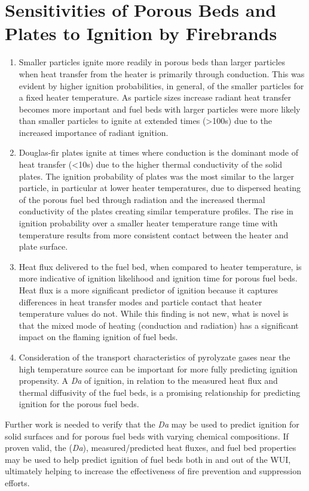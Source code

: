 \section{Sensitivities of Porous Beds and Plates to Ignition by Firebrands}
        \begin{enumerate}
            \item 
                Smaller particles ignite more readily in porous beds than larger particles when heat transfer from the heater is primarily through conduction. This was evident by higher ignition probabilities, in general, of the smaller particles for a fixed heater temperature. As particle sizes increase radiant heat transfer becomes more important and fuel beds with larger particles were more likely than smaller particles to ignite at extended times (\textgreater 100\si{\second}) due to the increased importance of radiant ignition. 
            \item
                Douglas-fir plates ignite at times where conduction is the dominant mode of heat transfer (\textless 10\si{\second}) due to the higher thermal conductivity of the solid plates. The ignition probability of plates was the most similar to the larger particle, in particular at lower heater temperatures, due to dispersed heating of the porous fuel bed through radiation and the increased thermal conductivity of the plates creating similar temperature profiles. The rise in ignition probability  over a smaller heater temperature range time with temperature results from more consistent contact between the heater and plate surface.
            \item 
                Heat flux delivered to the fuel bed, when compared to heater temperature, is more indicative of ignition likelihood and ignition time for porous fuel beds. Heat flux is a more significant predictor of ignition because it captures differences in heat transfer modes and particle contact that heater temperature values do not. While this finding is not new, what is novel is that the mixed mode of heating (conduction and radiation) has a significant impact on the flaming ignition of fuel beds.
            \item 
                Consideration of the transport characteristics of pyrolyzate gases near the high temperature source can be important for more fully predicting ignition propensity. A \textit{Da} of ignition, in relation to the measured heat flux and thermal diffusivity of the fuel beds, is a promising relationship for predicting ignition for the porous fuel beds.  
        \end{enumerate}
    Further work is needed to verify that the \textit{Da} may be used to predict ignition for solid surfaces and for porous fuel beds with varying chemical compositions.  If proven valid, the (\textit{Da}), measured/predicted heat fluxes, and fuel bed properties may be used to help predict ignition of fuel beds both in and out of the WUI, ultimately helping to increase the effectiveness of fire prevention and suppression efforts.


